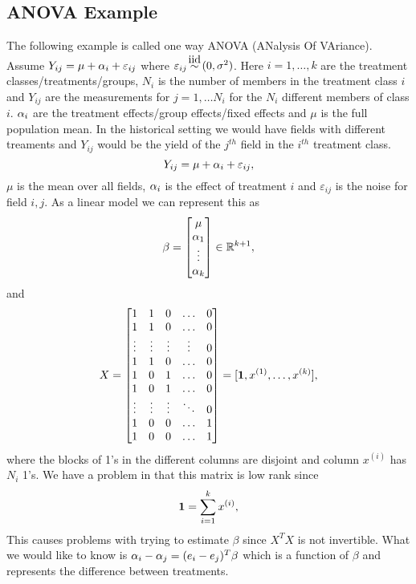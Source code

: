\subsection{ANOVA Example}
The following example is called one way ANOVA (ANalysis Of VAriance). Assume $Y_{ij} = \mu + {\alpha}_i + \varepsilon_{ij}$ where $\varepsilon_{ij} \iid (0,\sigma^2)$. Here $i = 1,\ldots, k$ are the treatment classes/treatments/groups, $N_i$ is the number of members in the treatment class $i$ and $Y_{ij}$ are the measurements for $j=1,\ldots N_i$ for the $N_i$ different members of class $i$. ${\alpha}_i$ are the treatment effects/group effects/fixed effects and $\mu$ is the full population mean. In the historical setting we would have fields with different treaments and $Y_{ij}$ would be the yield of the $j^{th}$ field in the $i^{th}$ treatment class.
\[Y_{ij} = \mu + {\alpha}_i + \varepsilon_{ij}, \]
$\mu $ is the mean over all fields, ${\alpha}_i$ is the effect of treatment $i$ and $\varepsilon_{ij}$ is the noise for field $i,j$. As a linear model we can represent this as
\[\beta = \begin{bmatrix}
    \mu \\ {\alpha}_1 \\ \vdots \\ {\alpha}_k
\end{bmatrix} \in {\mathbb R}^{k+1},  \]
and 
\[X=\begin{bmatrix}
    1&1&0&\ldots& 0\\
    1&1&0&\ldots&0\\
    \vdots&\vdots &\vdots&\vdots&0\\
    1&1&0&\ldots&0\\
    1&0&1&\ldots&0\\
    1&0&1&\ldots&0\\

    \vdots&\vdots &\vdots&\ddots&0\\
    1&0&0&\ldots&1\\
    1&0&0&\ldots&1
\end{bmatrix}=[{{\bf 1}}, x^{(1)},\ldots, x^{(k)}], \]
where the blocks of 1's in the different columns are disjoint and column $x^{(i)}$ has $N_i$ 1's. We have a problem in that this matrix is low rank since
\[{{\bf 1}} = \sum_{i=1}^k x^{(i)}, \]
This causes problems with trying to estimate $\beta$ since $X^TX$ is not invertible. What we would like to know is ${\alpha}_i - {\alpha}_j = (e_i-e_j)^T\beta$ which is a function of $\beta$ and represents the difference between treatments.
